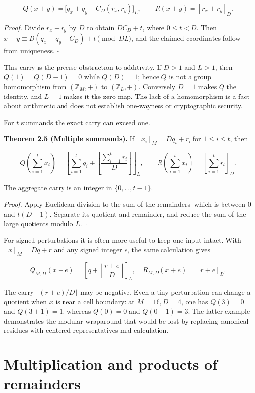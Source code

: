 \documentclass[
  11pt,
  a4paper,
  oneside]{report}
\begin{document}
\[
Q(x+y)=\bigl[q_x+q_y+C_D(r_x,r_y)\bigr]_L,
\qquad R(x+y)=[r_x+r_y]_D.
\]

\emph{Proof.} Divide \(r_x+r_y\) by \(D\) to obtain \(D C_D+t\), where
\(0\le t<D\). Then \(x+y\equiv D(q_x+q_y+C_D)+t\pmod{DL}\), and the
claimed coordinates follow from uniqueness. \(\square\)

This carry is the precise obstruction to additivity. If \(D>1\) and
\(L>1\), then \(Q(1)=Q(D-1)=0\) while \(Q(D)=1\); hence \(Q\) is not a
group homomorphism from \((\mathbb Z_M,+)\) to \((\mathbb Z_L,+)\).
Conversely \(D=1\) makes \(Q\) the identity, and \(L=1\) makes it the
zero map. The lack of a homomorphism is a fact about arithmetic and does
not establish one-wayness or cryptographic security.

For \(t\) summands the exact carry can exceed one.

\textbf{Theorem 2.5 (Multiple summands).} If \([x_i]_M=Dq_i+r_i\) for
\(1\le i\le t\), then

\[
Q\!\left(\sum_{i=1}^t x_i\right)
=\left[\sum_{i=1}^t q_i+
\left\lfloor\frac{\sum_{i=1}^t r_i}{D}\right\rfloor\right]_L,
\qquad
R\!\left(\sum_{i=1}^t x_i\right)
=\left[\sum_{i=1}^t r_i\right]_D.
\]

The aggregate carry is an integer in \(\{0,\ldots,t-1\}\).

\emph{Proof.} Apply Euclidean division to the sum of the remainders,
which is between \(0\) and \(t(D-1)\). Separate its quotient and
remainder, and reduce the sum of the large quotients modulo \(L\).
\(\square\)

For signed perturbations it is often more useful to keep one input
intact. With \([x]_M=Dq+r\) and any signed integer \(e\), the same
calculation gives

\[
Q_{M,D}(x+e)
=\left[q+\left\lfloor\frac{r+e}{D}\right\rfloor\right]_L,
\quad R_{M,D}(x+e)=[r+e]_D.
\]

The carry \(\lfloor(r+e)/D\rfloor\) may be negative. Even a tiny
perturbation can change a quotient when \(x\) is near a cell boundary:
at \(M=16,D=4\), one has \(Q(3)=0\) and \(Q(3+1)=1\), whereas \(Q(0)=0\)
and \(Q(0-1)=3\). The latter example demonstrates the modular wraparound
that would be lost by replacing canonical residues with centered
representatives mid-calculation.

\section{Multiplication and products of
remainders}\label{multiplication-and-products-of-remainders}
\end{document}

